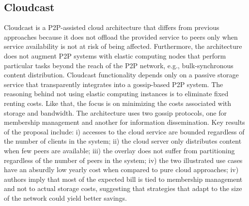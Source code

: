 \documentclass[runningheads]{llncs}
\begin{document}
\subsection{Cloudcast}
Cloudcast \cite{cloudcast} is a P2P-assisted cloud architecture that differs from previous approaches because it does not offload the provided service to peers only when service availability is not at risk of being affected. Furthermore, the architecture does not augment P2P systems with elastic computing nodes that perform particular tasks beyond the reach of the P2P network, e.g., bulk-synchronous content distribution. Cloudcast functionality depends only on a passive storage service that transparently integrates into a gossip-based P2P system. The reasoning behind not using elastic computing instances is to eliminate fixed renting costs. Like that, the focus is on minimizing the costs associated with storage and bandwidth. The architecture uses two gossip protocols, one for membership management and another for information dissemination. Key results of the proposal include: i) accesses to the cloud service are bounded regardless of the number of clients in the system; ii) the cloud server only distributes content when few peers are available; iii) the overlay does not suffer from partitioning regardless of the number of peers in the system; iv) the two illustrated use cases have an absurdly low yearly cost when compared to pure cloud approaches; iv) authors imply that most of the expected bill is tied to membership management and not to actual storage costs, suggesting that strategies that adapt to the size of the network could yield better savings.
\end{document}
